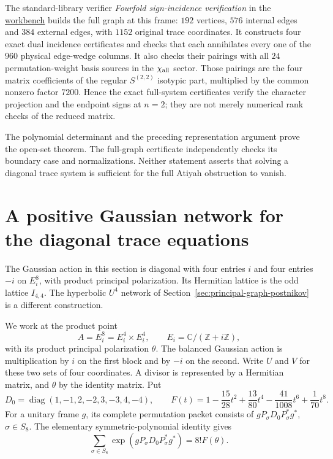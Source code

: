 \documentclass[11pt]{article}
\theoremstyle{definition}
\theoremstyle{remark}
\newcommand{\workbenchurl}{https://github.com/KokunoYumeto/algebraic-cycles-and-motives-workbench}
\begin{document}
The standard-library verifier
\emph{Fourfold sign-incidence verification} in the \href{\workbenchurl}{workbench} builds the full graph at this
frame: $192$ vertices, $576$ internal edges and $384$ external edges,
with $1152$ original trace coordinates.  It constructs four exact dual
incidence certificates and checks that each annihilates every one of the
$960$ physical edge-wedge columns.  It also checks their pairings with
all $24$ permutation-weight basis sources in the
$\chi_{\rm all}$ sector.  Those pairings are the four matrix
coefficients of the regular $S^{(2,2)}$ isotypic part, multiplied by the
common nonzero factor $7200$.  Hence the exact full-system certificates
verify the character projection and the endpoint signs at $n=2$;
they are not merely numerical rank checks of the reduced matrix.

The polynomial determinant and the preceding representation argument
prove the open-set theorem.  The full-graph certificate independently
checks its boundary case and normalizations.  Neither statement asserts
that solving a diagonal trace system is sufficient for the full Atiyah
obstruction to vanish.

\section{A positive Gaussian network for the diagonal trace equations}

The Gaussian action in this section is diagonal with four entries
$i$ and four entries $-i$ on $E_i^8$, with product principal
polarization. Its Hermitian lattice is the odd lattice $I_{4,4}$.
The hyperbolic $U^4$ network of
Section~\ref{sec:principal-graph-postnikov} is a different construction.

\label{sec:gaussian-trace-network}

We work at the product point
\[
 A=E_i^8=E_i^4\times E_i^4,
 \qquad E_i=\mathbb C/(\mathbb Z+i\mathbb Z),
\]
with its product principal polarization \(\theta\).  The balanced
Gaussian action is multiplication by \(i\) on the first block and by
\(-i\) on the second.  Write \(U\) and \(V\) for these two sets of four
coordinates.  A divisor is represented by a Hermitian matrix, and
\(\theta\) by the identity matrix.  Put
\[
 D_0=\operatorname{diag}(1,-1,2,-2,3,-3,4,-4),\qquad
 F(t)=1-\frac{15}{28}t^2+\frac{13}{80}t^4
       -\frac{41}{1008}t^6+\frac1{70}t^8.
\]
For a unitary frame \(g\), its complete permutation packet consists
of \(gP_\sigma D_0P_\sigma^*g^*\), \(\sigma\in S_8\).
The elementary symmetric-polynomial identity gives
\begin{equation}
 \sum_{\sigma\in S_8}
   \exp(gP_\sigma D_0P_\sigma^*g^*)=8!F(\theta).
 \label{eq:trace-packet-average}
\end{equation}
\end{document}
